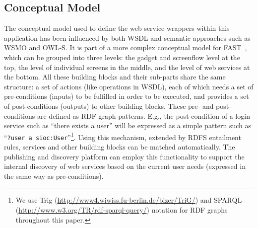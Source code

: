 
\subsection{Conceptual Model}
\label{ssec:ontology}
The conceptual model used to define the web service wrappers within this application has been influenced by both WSDL and semantic approaches such as WSMO and OWL-S. 
It is part of a more complex conceptual model for FAST~\cite{moeller2010fast_ontology}, which can be grouped into three levels: the gadget and screenflow level at the top, the level of individual screens in the middle, and the level of web services at the bottom. 
All these building blocks and their sub-parts
share the same structure: a set of actions (like operations in WSDL), each of which needs a set of pre-conditions (inputs) to be fulfilled in order to be executed, and provides a set of post-conditions (outputs) to other building blocks. These pre- and post-conditions are defined as RDF graph patterns. E.g., the post-condition of a login service such as ``there exists a user'' will be expressed as a simple pattern such as ``\texttt{?user a sioc:User}''\footnote{We use Trig (\url{http://www4.wiwiss.fu-berlin.de/bizer/TriG/}) and SPARQL (\url{http://www.w3.org/TR/rdf-sparql-query/}) notation for RDF graphs throughout this paper.}. Using this mechanism, extended by RDFS entailment rules, services and other building blocks can be matched automatically. The publishing and discovery platform can employ this functionality to support the internal discovery of web services based on the current user needs (expressed in the same way as pre-conditions).

